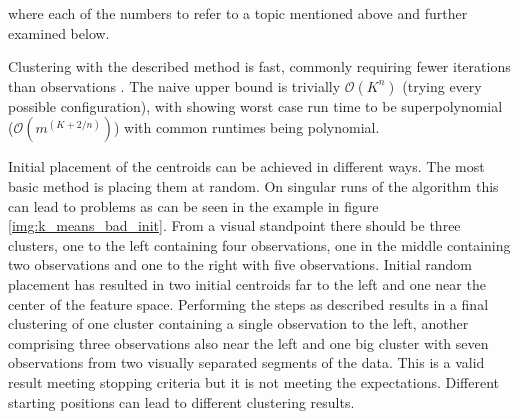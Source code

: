 where each of the numbers  to  refer to a topic mentioned above and further examined below.

Clustering with the described method is fast, commonly requiring fewer iterations than observations \cite{har2005fast}. The naive upper bound is trivially $\mathcal{O}(K^{n})$ (trying every possible configuration), with \cite{arthur2006slow} showing worst case run time to be superpolynomial ($\mathcal{O}(m^{(K+2/n)})$) with common runtimes being polynomial.

 Initial placement of the centroids can be achieved in different ways. The most basic method is placing them at random. On singular runs of the algorithm this can lead to problems as can be seen in the example in figure \ref{img:k_means_bad_init}. From a visual standpoint there should be three clusters, one to the left containing four observations, one in the middle containing two observations and one to the right with five observations. Initial random placement has resulted in two initial centroids far to the left and one near the center of the feature space. Performing the steps as described results in a final clustering of one cluster containing a single observation to the left, another comprising three observations also near the left and one big cluster with seven observations from two visually separated segments of the data. This is a valid result meeting stopping criteria but it is not meeting the expectations. Different starting positions can lead to different clustering results.

